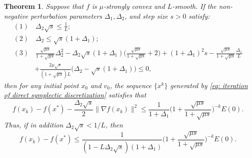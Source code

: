 \documentclass[11pt]{article}
\newcommand{\1}{\mathbf 1}
\numberwithin{equation}{section}
\newtheorem{THM}{Theorem}
\begin{document}
\begin{THM}
    \label{th:symplectic 2}
    Suppose that $f$ is $\mu$-strongly convex and $L$-smooth.  
    If the non-negative perturbation parameters $\Delta_1, \Delta_2$, and step size $s>0$ satisfy:
\begin{equation}
    \label{conditions of direct symplectic 2}
    \begin{aligned}
        (1)& \, \Delta_2\sqrt{s}\leqslant \frac{1}{L};\\
        (2)& \, \Delta_2\leqslant \sqrt{s}(1+\Delta_1);\\
        (3)& \, \frac{\sqrt{\mu s}}{1+\sqrt{\mu s}}\Delta_2^2-\Delta_2\sqrt{s}(1+\Delta_1)\Big(\frac{\sqrt{\mu s}}{1+\sqrt{\mu s}}+2\Big)+(1+\Delta_1)^2s
        -\frac{\sqrt{\mu s}}{1+\sqrt{\mu s}}\frac{\Delta_1}{L}\\
        &+\frac{2\mu\sqrt{s}}{(1+\sqrt{\mu s})L}\big(\Delta_2-\sqrt{s}(1+\Delta_1)\big)\leqslant 0,
    \end{aligned}
\end{equation}
then for any initial point $x_0$ and $v_0$, the sequence $\{x^k\}$ generated by \eqref{eq: iteration of direct symplectic discretization} satisfies that 
\begin{equation*}
    f(x_k)-f(x^*)-\frac{\Delta_2\sqrt{s}}{2}\|\nabla f(x_k)\|^2 \leqslant \frac{1}{1+\Delta_1}\Big(1+\frac{\sqrt{\mu s}}{1+\sqrt{\mu s}}\Big)^{-k}E(0).
\end{equation*}
Thus, if in addition $\Delta_2\sqrt{s}< 1/L$, then
\begin{equation}\label{eq:f_rate_symplectic}
    f(x_k)-f(x^*)\leqslant \frac{1}{(1-L\Delta_2\sqrt{s})(1+\Delta_1)}\Big(1+\frac{\sqrt{\mu s}}{1+\sqrt{\mu s}}\Big)^{-k}E(0).
\end{equation}
\end{THM}
\end{document}

